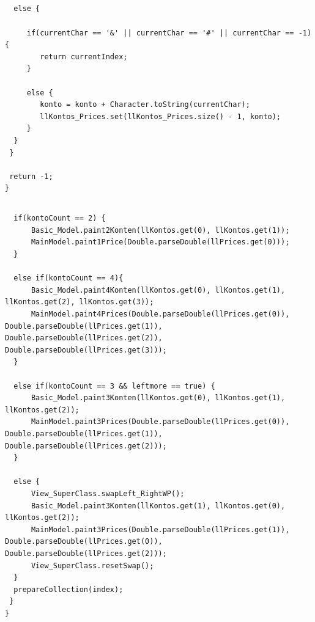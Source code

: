 \documentclass[12pt]{report}
\begin{document}
\subsection{}
\begin{lstlisting}
  else {
				
     if(currentChar == '&' || currentChar == '#' || currentChar == -1) {
        return currentIndex;
     }
				
     else {
        konto = konto + Character.toString(currentChar);
        llKontos_Prices.set(llKontos_Prices.size() - 1, konto);
     }
  }
 }
		
 return -1;
}
\end{lstlisting}

\subsection{}
\begin{lstlisting}
  if(kontoCount == 2) {
      Basic_Model.paint2Konten(llKontos.get(0), llKontos.get(1));
      MainModel.paint1Price(Double.parseDouble(llPrices.get(0)));
  }

  else if(kontoCount == 4){
      Basic_Model.paint4Konten(llKontos.get(0), llKontos.get(1), llKontos.get(2), llKontos.get(3));
      MainModel.paint4Prices(Double.parseDouble(llPrices.get(0)),  Double.parseDouble(llPrices.get(1)), Double.parseDouble(llPrices.get(2)), Double.parseDouble(llPrices.get(3)));
  }

  else if(kontoCount == 3 && leftmore == true) {
      Basic_Model.paint3Konten(llKontos.get(0), llKontos.get(1), llKontos.get(2));
      MainModel.paint3Prices(Double.parseDouble(llPrices.get(0)),  Double.parseDouble(llPrices.get(1)), Double.parseDouble(llPrices.get(2)));
  }

  else {
      View_SuperClass.swapLeft_RightWP();
      Basic_Model.paint3Konten(llKontos.get(1), llKontos.get(0), llKontos.get(2));
      MainModel.paint3Prices(Double.parseDouble(llPrices.get(1)),  Double.parseDouble(llPrices.get(0)), Double.parseDouble(llPrices.get(2)));
      View_SuperClass.resetSwap();
  }
  prepareCollection(index);
 }	
}
\end{lstlisting}
\end{document}
